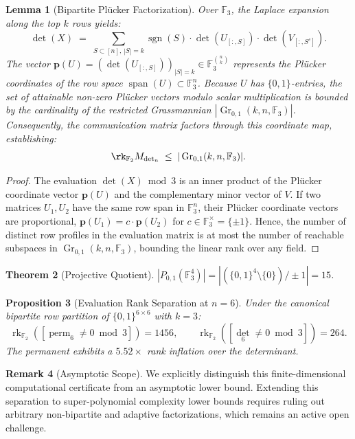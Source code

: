 \documentclass[11pt,a4paper]{amsart}
\newcommand{\perm}{\operatorname{perm}}
\newcommand{\rkF}{\operatorname{rk}_{\mathbb{F}_2}}
\newcommand{\Gr}{\operatorname{Gr}}
\newcommand{\FF}{\mathbb{F}}
\newtheorem{theorem}{Theorem}
\newtheorem{lemma}[theorem]{Lemma}
\newtheorem{proposition}[theorem]{Proposition}
\theoremstyle{definition}
\newtheorem{remark}[theorem]{Remark}
\begin{document}
\begin{lemma}[Bipartite Plücker Factorization]\label{lem:plucker-factorization}
Over $\FF_3$, the Laplace expansion along the top $k$ rows yields:
\[
  \det(X) \;=\; \sum_{S \subset [n],\, |S|=k} \operatorname{sgn}(S) \cdot \det(U_{[:, S]}) \cdot \det(V_{[:, S^c]}).
\]
The vector $\mathbf{p}(U) = (\det(U_{[:, S]}))_{|S|=k} \in \FF_3^{\binom{n}{k}}$ represents the Plücker
coordinates of the row space $\operatorname{span}(U) \subset \FF_3^n$.
Because $U$ has $\{0,1\}$-entries, the set of attainable non-zero Plücker vectors modulo scalar
multiplication is bounded by the cardinality of the restricted Grassmannian $|\Gr_{0,1}(k, n, \FF_3)|$.
Consequently, the communication matrix factors through this coordinate map, establishing:
\[
  \rk_{\FF_2} M_{\det_n} \;\le\; |\Gr_{0,1}(k, n, \FF_3)|.
\]
\end{lemma}

\begin{proof}
The evaluation $\det(X) \bmod 3$ is an inner product of the Plücker coordinate vector $\mathbf{p}(U)$
and the complementary minor vector of $V$. If two matrices $U_1, U_2$ have the same row span in $\FF_3^n$,
their Plücker coordinate vectors are proportional, $\mathbf{p}(U_1) = c \cdot \mathbf{p}(U_2)$ for $c \in \FF_3^\times = \{\pm 1\}$.
Hence, the number of distinct row profiles in the evaluation matrix is at most the number of reachable
subspaces in $\Gr_{0,1}(k, n, \FF_3)$, bounding the linear rank over any field.
\end{proof}

\begin{theorem}[Projective Quotient]\label{thm:quotient}
  $|P_{0,1}(\FF_3^4)| = |(\{0,1\}^4 \setminus \{0\}) / \pm 1| = 15$.
\end{theorem}

\begin{proposition}[Evaluation Rank Separation at $n=6$]\label{prop:rank-separation}
Under the canonical bipartite row partition of $\{0,1\}^{6 \times 6}$ with $k = 3$:
\[
  \rkF([\perm_6 \ne 0 \bmod 3]) = 1456, \qquad \rkF([\det_6 \ne 0 \bmod 3]) = 264.
\]
The permanent exhibits a $5.52\times$ rank inflation over the determinant.
\end{proposition}

\begin{remark}[Asymptotic Scope]
We explicitly distinguish this finite-dimensional computational certificate from an asymptotic
lower bound. Extending this separation to super-polynomial complexity lower bounds requires
ruling out arbitrary non-bipartite and adaptive factorizations, which remains an active open challenge.
\end{remark}
\end{document}

